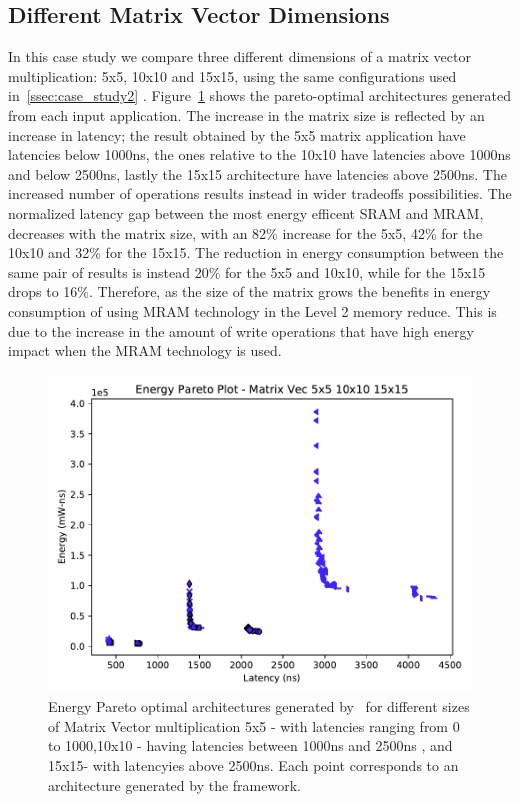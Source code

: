 \subsection{Different Matrix Vector Dimensions}
In this case study we compare three different dimensions of a matrix vector multiplication: 5x5, 10x10 and 15x15, using the same configurations used in~\ref{ssec:case_study2} . Figure~\ref{fig:sram_vs_mram_pareto_vec_sizes} shows the pareto-optimal architectures generated from each input application. The increase in the matrix size is reflected by an increase in latency; the result obtained by the 5x5 matrix application have latencies below 1000ns, the ones relative to the 10x10 have latencies above 1000ns and below 2500ns, lastly the 15x15 architecture have latencies above 2500ns. The increased number of operations results instead in wider tradeoffs possibilities. The normalized latency gap between the most energy efficent SRAM and MRAM, decreases with the matrix size, with an 82\% increase for the 5x5, 42\% for the 10x10 and 32\% for the 15x15. The reduction in energy consumption between the same pair of results is instead 20\% for the 5x5 and 10x10, while for the 15x15 drops to 16\%. Therefore, as the size of the matrix grows the benefits in energy consumption of using MRAM technology in the Level 2 memory reduce. This is due to the increase in the amount of write operations that have high energy impact when the MRAM technology is used. 

\begin{figure}[tb] 
\centering
\includegraphics[width=\columnwidth]{graphs/EnergyParetoPlotMultipleSizeMAtrixVec.pdf}
    \caption{\small Energy Pareto optimal architectures generated by \frameworkname ~for different sizes of Matrix Vector multiplication 5x5 - with latencies ranging from 0 to 1000,10x10 - having latencies between 1000ns and 2500ns , and 15x15- with latencyies above 2500ns. Each point corresponds to an architecture generated by the framework.}
\label{fig:sram_vs_mram_pareto_vec_sizes}
\end{figure}


